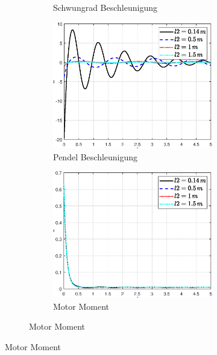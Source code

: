 \begin{figure}
\begin{figure}
\begin{subfigure}[b]{0.49 \linewidth}
        \caption{Schwungrad Beschleunigung}
        \label{fig:l2_phi_punkt_punkt}
    \end{subfigure}
    \begin{subfigure}[b]{0.49 \linewidth}
        \includegraphics[width=\linewidth]{Bilder/5_sensi/fig/l2/theta_punkt_punkt.eps}
        \caption{Pendel Beschleunigung}
        \label{fig:l2_theta_punkt_punkt}
    \end{subfigure}
    \begin{subfigure}[b]{0.49\linewidth}
        \includegraphics[width=\linewidth]{Bilder/5_sensi/fig/l2/tau.eps}
        \caption{Motor Moment}

\end{subfigure}
\end{figure}
\end{figure}
